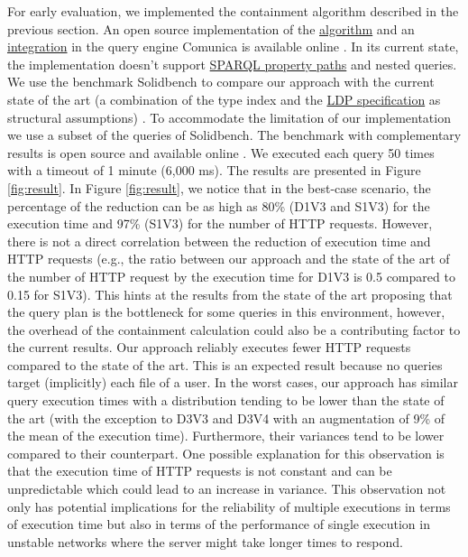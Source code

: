 For early evaluation, we implemented the containment algorithm described in the previous section.
An open source implementation of the \href{https://github.com/constraintAutomaton/query-shape-detection}{algorithm} and an \href{https://github.com/constraintAutomaton/comunica-feature-link-traversal/tree/feature/shapeIndex}{integration} in the query engine Comunica \cite{taelman_iswc_resources_comunica_2018} is available online .
In its current state, the implementation doesn't support 
\href{https://www.w3.org/TR/sparql11-query/#propertypaths}{SPARQL property paths} and nested queries.
We use the benchmark Solidbench \cite{Taelman2023} to compare our approach with the current state of the art 
(a combination of the type index and the \href{https://www.w3.org/TR/ldp/}{LDP specification} as structural assumptions) \cite{Taelman2023}.
To accommodate the limitation of our implementation we use a subset of the queries of Solidbench.
The benchmark with complementary results is open source and available online .
We executed each query 50 times with a timeout of 1 minute (6,000 ms).
The results are presented in Figure \ref{fig:result}.
In Figure \ref{fig:result}, we notice that in the best-case scenario, the percentage of the reduction can be as high as 80\% (D1V3 and S1V3) for the execution time 
and 97\% (S1V3) for the number of HTTP requests.
However, there is not a direct correlation between the reduction of execution time and HTTP requests (e.g., the ratio 
between our approach and the state of the art of the number of HTTP request by the execution time for D1V3 is 0.5 compared to 0.15 for S1V3).
This hints at the results from the state of the art \cite{Taelman2023} proposing that the query plan is the bottleneck for some queries in this environment,
however, the overhead of the containment calculation could also be a contributing factor to the current results.
Our approach reliably executes fewer HTTP requests compared to the state of the art.
This is an expected result because no queries target (implicitly) each file of a user.
In the worst cases, our approach  has similar query execution times with a 
distribution tending to be lower than the state of the art (with the exception to D3V3 and D3V4 with an augmentation of 9\% of the mean of the execution time).
Furthermore, their variances tend to be lower compared to their counterpart. 
One possible explanation for this observation is that the execution time of HTTP requests is not constant and can be unpredictable \cite{hartig2016walking}
which could lead to an increase in variance.
This observation not only has potential implications for the reliability of multiple executions in terms of execution time
but also in terms of the performance of single execution in unstable networks where the server might take longer times to respond. 
